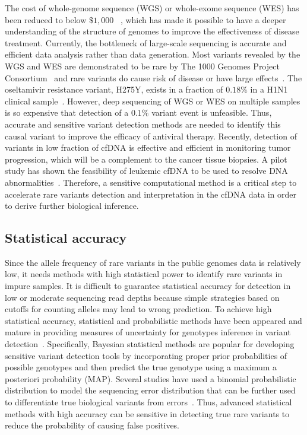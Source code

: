 \documentclass[a4,center,fleqn]{NAR}
\begin{document}
The cost of whole-genome sequence (WGS) or whole-exome sequence (WES) has been reduced to below $\$1,000$ ~\citep{caulfield2013reflections}, which has made it possible to have a deeper understanding of the structure of genomes to improve the effectiveness of disease treatment. 
Currently, the bottleneck of large-scale sequencing is accurate and efficient data analysis rather than data generation.
Most variants revealed by the WGS and WES are demonstrated to be rare by The 1000 Genomes Project Consortium~\citep{10002010map} and rare variants do cause risk of disease or have large effects~\citep{kosmicki2016discovery, ng2010exome}.
The oseltamivir resistance variant, H275Y, exists in a fraction of $0.18\%$ in a H1N1 clinical sample~\citep{Flaherty2012}.
However, deep sequencing of WGS or WES on multiple samples is so expensive that detection of a $0.1\%$ variant event is unfeasible.
Thus, accurate and sensitive variant detection methods are needed to identify this causal variant to improve the efficacy of antiviral therapy.
Recently, detection of variants in low fraction of cfDNA is effective and efficient in monitoring tumor progression, which will be a complement to the cancer tissue biopsies.
A pilot study has shown the feasibility of leukemic cfDNA to be used to resolve DNA abnormalities~\citep{zhou2014pilot}.
Therefore, a sensitive computational method is a critical step to accelerate rare variants detection and interpretation in the cfDNA data in order to derive further biological inference.


\subsection{Statistical accuracy}

Since the allele frequency of rare variants in the public genomes data is relatively low, it needs methods with high statistical power to identify rare variants in impure samples. 
It is difficult to guarantee statistical accuracy for detection in low or moderate sequencing read depths because simple strategies based on cutoffs for counting alleles may lead to wrong prediction.
To achieve high statistical accuracy, statistical and probabilistic methods have been appeared and mature in providing measures of uncertainty for genotypes inference in variant detection~\citep{Nielsen2011}.  
Specifically, Bayesian statistical methods are popular for developing sensitive variant detection tools by incorporating proper prior probabilities of possible genotypes and then predict the true genotype using a maximum a posteriori probability (MAP).
Several studies have used a binomial probabilistic distribution to model the sequencing error distribution that can be further used to differentiate true biological variants from errors~\citep{Flaherty2012, Shiraishi2013, gerstung2012reliable, Christoforides2013}.
Thus, advanced statistical methods with high accuracy can be sensitive in detecting true rare variants to reduce the probability of causing false positives.
\end{document}
